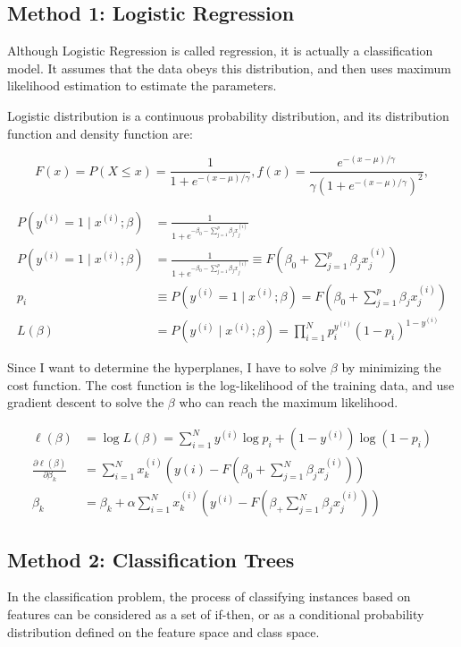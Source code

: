 \documentclass[11pt]{report}
\begin{document}
\subsection{Method 1: Logistic Regression}
Although Logistic Regression is called regression, it is actually a classification model. It assumes that the data obeys this distribution, and then uses maximum likelihood estimation to estimate the parameters.

Logistic distribution is a continuous probability distribution, and its distribution function and density function are:

\[
     F(x) = P(X \leq x) = \frac{1}{1 + e^{-(x - \mu)/\gamma}}, f(x) = \frac{e^{-(x - \mu)/\gamma}}{\gamma(1 + e^{-(x - \mu)/\gamma})^2},
\]

\begin{align*}
     P\left( y^{(i)}=1 \mid x^{(i)} ; \beta  \right) &=\frac{1}{1+e^{-\beta _0-\sum_{j=1}^p \beta _j x_j^{(i)}}} \\
     P\left( y^{(i)}=1 \mid x^{(i)} ; \beta  \right) &=\frac{1}{1+e^{-\beta _0-\sum_{j=1}^p \beta _j x_j^{(i)}}} \equiv  F\left( \beta _0+\sum_{j=1}^p \beta _j x_j^{(i)}\right)  \\
     p_i &\equiv P\left( y^{(i)}=1 \mid x^{(i)} ; \beta  \right) =F\left( \beta _0+\sum_{j=1}^p \beta _j x_j^{(i)}\right)  \\
     L(\beta )&=P\left( y^{(i)} \mid x^{(i)} ; \beta  \right) =\prod_{i=1}^N p_i^{y^{(i)}}\left( 1-p_i\right) ^{1-y^{(i)}}
 \end{align*}
 
 Since I want to determine the hyperplanes, I have to solve $\beta $ by minimizing the cost function. The cost function is the log-likelihood of the training data, and use gradient descent to solve the $\beta $ who can reach the maximum likelihood.
 
 \begin{align*}
     \ell(\beta ) &= \log L(\beta ) = \sum_{i=1}^N y^{(i)} \log p_i+\left( 1-y^{(i)}\right)  \log \left( 1-p_i\right)  \\
     \frac{\partial \ell (\beta )}{\partial \beta _k}&=\sum_{i=1}^N x_k^{(i)}\left( y{(i)}-F\left( \beta _0+\sum_{j=1}^N \beta _j x_j^{(i)}\right) \right)  \\
     \beta _k&=\beta _k+\alpha \sum_{i=1}^N x_k^{(i)}\left( y^{(i)}-F\left( \beta _+\sum_{j=1}^N \beta _j x_j^{(i)}\right) \right) 
 \end{align*}
 
\subsection{Method 2: Classification Trees}
In the classification problem, the process of classifying instances based on features can be considered as a set of if-then, or as a conditional probability distribution defined on the feature space and class space.
\end{document}
